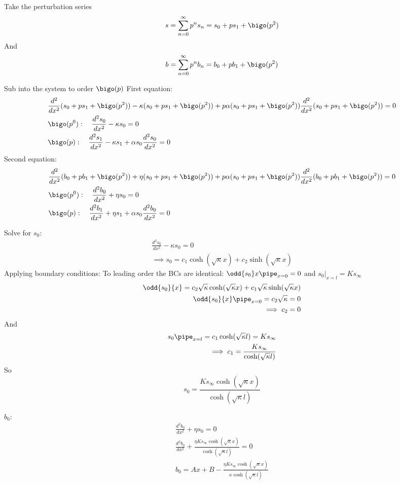 \documentclass{X:/Documents/Coding/Latex/myassignment}
\begin{document}
Take the perturbation series
\[s = \sum_{n=0}^\infty p^n s_n = s_0 + ps_1 + \bigo(p^2)\]
And
\[b = \sum_{n=0}^\infty p^n b_n = b_0 + pb_1 + \bigo(p^2)\]

Sub into the system to order $\bigo(p)$
First equation:
\begin{align*}
	&\frac{d^2}{dx^2}(s_0 + ps_1 + \bigo(p^2)) - \kappa (s_0 + ps_1 + \bigo(p^2)) + p \alpha (s_0 + ps_1 + \bigo(p^2))\frac{d^2}{dx^2}(s_0 + ps_1 + \bigo(p^2)) = 0\\
	&\bigo(p^0) : \quad \frac{d^2s_0}{dx^2} - \kappa s_0 = 0\\
	&\bigo(p) : \quad \frac{d^2s_1}{dx^2} - \kappa s_1 +  \alpha s_0 \frac{d^2s_0}{dx^2} = 0\\
\end{align*}
Second equation:
\begin{align*}
	&\frac{d^2}{dx^2}(b_0 + pb_1 + \bigo(p^2)) + \eta (s_0 + ps_1 + \bigo(p^2)) + p \alpha (s_0 + ps_1 + \bigo(p^2)) \frac{d^2}{dx^2}(b_0 + pb_1 + \bigo(p^2)) = 0\\
	&\bigo(p^0) : \quad	\frac{d^2b_0}{dx^2} + \eta s_0  = 0\\
	&\bigo(p) : \quad \frac{d^2b_1}{dx^2}+ \eta s_1 + \alpha s_0 \frac{d^2b_0}{dx^2} =0
\end{align*}


Solve for $s_0$:
\begin{align*}
	\frac{d^2s_0}{dx^2} - \kappa s_0 = 0\\
	\implies s_0 = c_1\cosh(\sqrt{\kappa} x) + c_2 \sinh(\sqrt{\kappa}x)
\end{align*}
Applying boundary conditions:
To leading order the BCs are identical: $\odd{s_0}x\pipe_{x=0} = 0$ and $s_0|_{x=l} = Ks_{\infty}$
\begin{align*}
	\odd{s_0}{x} =  c_2\sqrt{\kappa}\cosh(\sqrt{\kappa} x) + c_1 \sqrt{\kappa}\sinh(\sqrt{\kappa}x)\\
	\odd{s_0}{x}\pipe_{x=0} =  c_2\sqrt{\kappa} = 0\\
	\implies c_2 =0 
\end{align*}
And 
\begin{align*}
	s_0\pipe_{x=l} = c_1\cosh(\sqrt{\kappa} l) = Ks_{\infty}\\
	\implies c_1 = \frac{Ks_{\infty}}{\cosh(\sqrt{\kappa} l)}
\end{align*}
So 
\[\boxed{s_0 = \frac{Ks_{\infty}\cosh(\sqrt{\kappa} x)}{\cosh(\sqrt{\kappa} l)}}\]

$b_0$:
\begin{align*}
	\frac{d^2b_0}{dx^2} + \eta s_0  = 0\\
	\frac{d^2b_0}{dx^2} +\frac{\eta Ks_{\infty}\cosh(\sqrt{\kappa} x)}{\cosh(\sqrt{\kappa} l)} =0\\
	b_0 = Ax + B - \frac{\eta Ks_{\infty}\cosh(\sqrt{\kappa} x)}{\kappa\cosh(\sqrt{\kappa} l)}\\
\end{align*}
\end{document}
